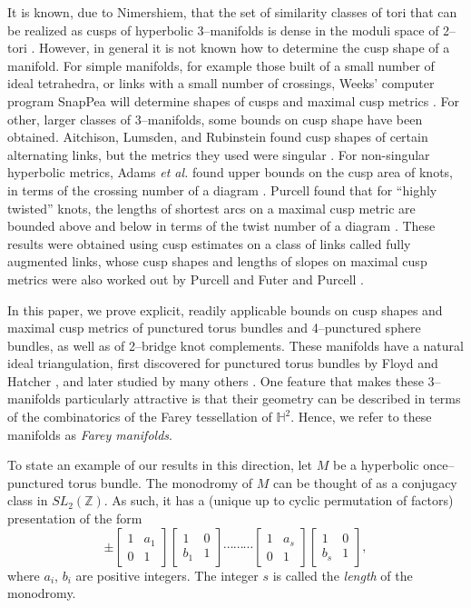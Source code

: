 \documentclass[11pt]{amsart}
\newcommand{\HH}{{\mathbb{H}}}
\newcommand{\ZZ}{{\mathbb{Z}}}
\theoremstyle{plain}
\theoremstyle{definition}
\begin{document}
It is known, due to Nimershiem, that the set of similarity classes of
tori that can be realized as cusps of hyperbolic 3--manifolds is dense
in the moduli space of 2--tori \cite{nimershiem:flat-tori}.  However,
in general it is not known how to determine the cusp shape of a
manifold.  For simple manifolds, for example those built of a small
number of ideal tetrahedra, or links with a small number of crossings,
Weeks' computer program SnapPea will determine shapes of cusps and
maximal cusp metrics \cite{weeks:snappea}.  For other, larger classes
of 3--manifolds, some bounds on cusp shape have been obtained.
Aitchison, Lumsden, and Rubinstein found cusp shapes of certain
alternating links, but the metrics they used were singular
\cite{alr:alternating}.  For non-singular hyperbolic metrics, Adams
\emph{et al.} found upper bounds on the cusp area of knots, in terms
of the crossing number of a diagram \cite{adams-students:cusp-area}.
Purcell found that for ``highly twisted'' knots, the lengths of
shortest arcs on a maximal cusp metric are bounded above and below in
terms of the twist number of a diagram \cite{purcell:cusps}.  These
results were obtained using cusp estimates on a class of links called
fully augmented links, whose cusp shapes and lengths of slopes on
maximal cusp metrics were also worked out by Purcell
\cite{purcell:cusps} and Futer and Purcell \cite{futer-purcell}.


In this paper, we prove explicit, readily applicable bounds on cusp
shapes and maximal cusp metrics of punctured torus bundles and
4--punctured sphere bundles, as well as of 2--bridge knot complements.
These manifolds have a natural ideal triangulation, first discovered
for punctured torus bundles by Floyd and Hatcher \cite{floyd-hatcher},
and later studied by many others \cite{akiyoshi, aswy,
gueritaud:thesis, lackenby:punct}.  One feature that makes these
3--manifolds particularly attractive is that their geometry can be
described in terms of the combinatorics of the Farey tessellation of
$\HH^2$.  Hence, we refer to these manifolds as \emph{Farey
manifolds}.

To state an example of our results in this direction, let $M$ be a
hyperbolic once--punctured torus bundle.  The monodromy of $M$ can be
thought of as a conjugacy class in $SL_2(\ZZ)$.  As such, it has a
(unique up to cyclic permutation of factors) presentation of the form
$$ \pm \begin{bmatrix} 1 & a_1 \\ 0 & 1 \end{bmatrix}
\begin{bmatrix} 1 & 0 \\ b_1& 1 \end{bmatrix} \cdots \cdots \cdots
\begin{bmatrix} 1 & a_s \\ 0 & 1 \end{bmatrix}
\begin{bmatrix} 1 & 0 \\ b_s & 1\end{bmatrix},$$
%
where $a_i$, $b_i$ are positive integers.  The integer $s$ is called
the \emph{length} of the monodromy.
\end{document}
